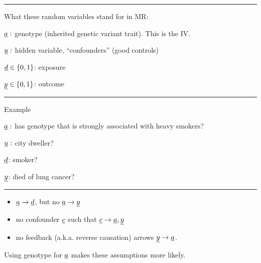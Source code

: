 \hrule\noindent What these random variables stand for in MR:

${\underline{a}}:$ genotype (inherited genetic variant trait).
This is the IV.

${\underline{u}}:$ hidden variable, \enquote{confounders} (good
controls) 


${\underline{d}}\in\{0,1\}$: exposure

${\underline{y}}\in\{0,1\}$: outcome 

\hrule
\noindent  Example

${\underline{a}}:$ has genotype
that is strongly associated with heavy smokers?

${\underline{u}}:$ city dweller?


${\underline{d}}$: smoker?

${\underline{y}}$: died of lung cancer?



\hrule{}

\begin{itemize}
\item ${\underline{a}}\rightarrow {\underline{d}}$, but
no ${\underline{a}}\rightarrow {\underline{y}}$
\item
no confounder ${\underline{c}}$ such that ${\underline{c}}\rightarrow {\underline{a}}, {\underline{y}}$ 
\item 
no feedback
(a.k.a. reverse causation) arrows ${\underline{y}}\rightarrow {\underline{a}}$.
\end{itemize}

Using genotype for ${\underline{a}}$ makes
these assumptions more likely.
